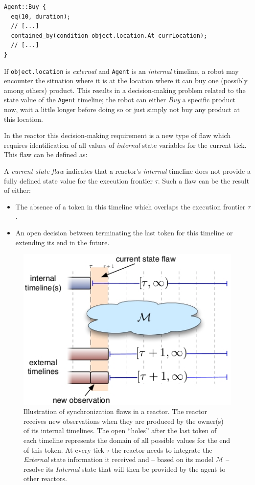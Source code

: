 \begin{verbatim}
Agent::Buy {
  eq(10, duration);
  // [...]
  contained_by(condition object.location.At currLocation);
  // [...]
}
\end{verbatim}

If \texttt{object.location} is {\em external} and
\texttt{Agent} is an {\em internal} timeline, a robot may encounter
the situation where it is at the location where it can buy one
(possibly among others) product. This results in a decision-making
problem related to the state value of the \texttt{Agent} timeline; the
robot can either {\em Buy} a specific product now, wait a little
longer before doing so or just simply not buy any product at this
location.

In the  reactor this decision-making
requirement is a new type of flaw which requires identification of all
values of {\em internal} state variables for the current tick. This
flaw can be defined as:

\begin{definition}
  \label{def:csf}
  A {\em current state flaw} indicates that a reactor's {\em internal}
  timeline does not provide a fully defined state value for the
  execution frontier $\tau$. Such a flaw can be the result of either:

  \begin{itemize}
  \item The absence of a token in this timeline which overlaps the
    execution frontier $\tau$.
  \item An open decision between terminating the last token for this
    timeline or extending its end in the future.
  \end{itemize}

\end{definition} 

\begin{figure}[!htbp]
  \centering
  \includegraphics[width=0.5\columnwidth]{figs/synch-relation.jpeg}
  \caption{\small Illustration of synchronization flaws in a
    reactor. The reactor receives new observations when they are
    produced by the owner(s) of its internal timelines. The open
    ``holes'' after the last token of each timeline represents the
    domain of all possible values for the end of this token. At every
    tick $\tau$ the reactor needs to integrate the {\em External}
    state information it received and -- based on its model
    $\mathcal{M}$ -- resolve its {\em Internal} state that will then
    be provided  by the agent to other reactors.}
  \label{fig:synch:flaw}
\end{figure}


